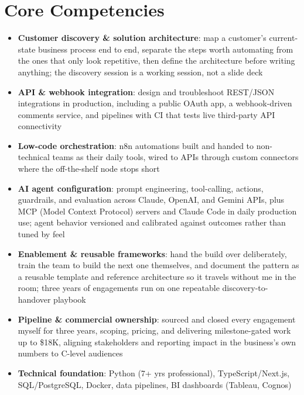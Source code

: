 \documentclass[11pt,a4paper,sans]{moderncv}
\begin{document}
\section{Core Competencies}
\vspace{1pt}
\begin{itemize}

\item \textbf{Customer discovery \& solution architecture}: map a customer's current-state business process end to end, separate the steps worth automating from the ones that only look repetitive, then define the architecture before writing anything; the discovery session is a working session, not a slide deck

\item \textbf{API \& webhook integration}: design and troubleshoot REST/JSON integrations in production, including a public OAuth app, a webhook-driven comments service, and pipelines with CI that tests live third-party API connectivity

\item \textbf{Low-code orchestration}: n8n automations built and handed to non-technical teams as their daily tools, wired to APIs through custom connectors where the off-the-shelf node stops short

\item \textbf{AI agent configuration}: prompt engineering, tool-calling, actions, guardrails, and evaluation across Claude, OpenAI, and Gemini APIs, plus MCP (Model Context Protocol) servers and Claude Code in daily production use; agent behavior versioned and calibrated against outcomes rather than tuned by feel

\item \textbf{Enablement \& reusable frameworks}: hand the build over deliberately, train the team to build the next one themselves, and document the pattern as a reusable template and reference architecture so it travels without me in the room; three years of engagements run on one repeatable discovery-to-handover playbook

\item \textbf{Pipeline \& commercial ownership}: sourced and closed every engagement myself for three years, scoping, pricing, and delivering milestone-gated work up to \$18K, aligning stakeholders and reporting impact in the business's own numbers to C-level audiences

\item \textbf{Technical foundation}: Python (7+ yrs professional), TypeScript/Next.js, SQL/PostgreSQL, Docker, data pipelines, BI dashboards (Tableau, Cognos)

\end{itemize}
\end{document}
